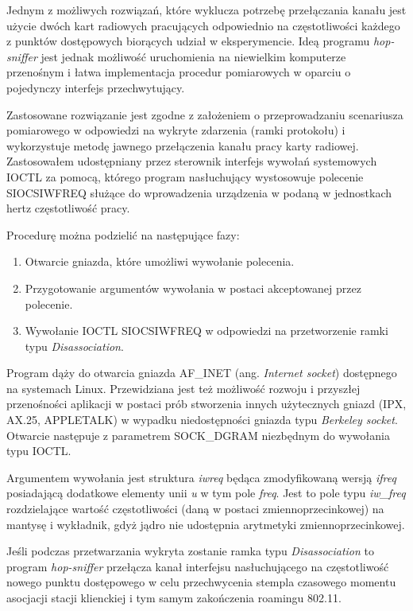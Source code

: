 Jednym z możliwych rozwiązań, które wyklucza potrzebę przełączania kanału jest użycie dwóch kart radiowych pracujących odpowiednio na częstotliwości każdego z punktów dostępowych biorących udział w eksperymencie. Ideą programu \emph{hop-sniffer} jest jednak możliwość uruchomienia na niewielkim komputerze przenośnym i łatwa implementacja procedur pomiarowych w oparciu o pojedynczy interfejs przechwytujący. 

Zastosowane rozwiązanie jest zgodne z założeniem o przeprowadzaniu scenariusza pomiarowego w odpowiedzi na wykryte zdarzenia (ramki protokołu) i wykorzystuje metodę jawnego przełączenia kanału pracy karty radiowej. Zastosowałem udostępniany przez sterownik interfejs wywołań systemowych IOCTL za pomocą, którego program nasłuchujący wystosowuje polecenie SIOCSIWFREQ służące do wprowadzenia urządzenia w podaną w jednostkach hertz częstotliwość pracy. 

Procedurę można podzielić na następujące fazy:
\begin{enumerate}
\item Otwarcie gniazda, które umożliwi wywołanie polecenia.
\item Przygotowanie argumentów wywołania w postaci akceptowanej przez polecenie.
\item Wywołanie IOCTL SIOCSIWFREQ w odpowiedzi na przetworzenie ramki typu \emph{Disassociation}.
\end{enumerate}

Program dąży do otwarcia gniazda AF\_INET (ang. \emph{Internet socket}) dostępnego na systemach Linux. Przewidziana jest też możliwość rozwoju i przyszłej przenośności aplikacji w postaci prób stworzenia innych użytecznych gniazd (IPX, AX.25, APPLETALK) w wypadku niedostępności gniazda typu \emph{Berkeley socket}. Otwarcie następuje z parametrem SOCK\_DGRAM niezbędnym do wywołania typu IOCTL.

Argumentem wywołania jest struktura \emph{iwreq} będąca zmodyfikowaną wersją \emph{ifreq} posiadającą dodatkowe elementy unii \emph{u} w tym pole \emph{freq}. Jest to pole typu \emph{iw\_freq} rozdzielające wartość częstotliwości (daną w postaci zmiennoprzecinkowej) na mantysę i wykładnik, gdyż jądro nie udostępnia arytmetyki zmiennoprzecinkowej.


Jeśli podczas przetwarzania wykryta zostanie ramka typu \emph{Disassociation} to program \emph{hop-sniffer} przełącza kanał interfejsu nasłuchującego na częstotliwość nowego punktu dostępowego w celu przechwycenia stempla czasowego momentu asocjacji stacji klienckiej i tym samym zakończenia roamingu 802.11.


